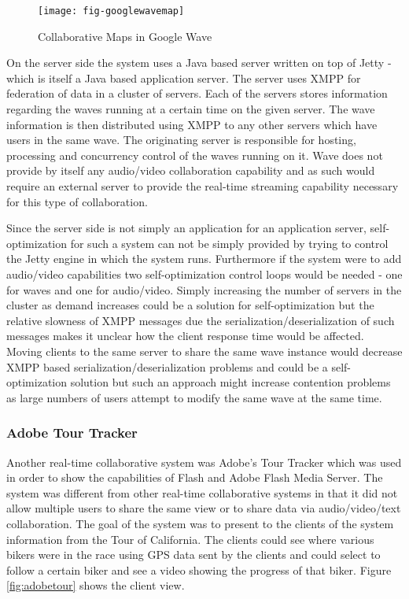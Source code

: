 {\begin{figure}
	\centering
	\texttt{[image: fig-googlewavemap]}
	\caption{Collaborative Maps in Google Wave}
	\label{fig:googlewave}
\end{figure}

On the server side the system uses a Java based server written on top of Jetty - which is itself a Java based application server. The server uses XMPP for federation of data in a cluster of servers. Each of the servers stores information regarding the waves running at a certain time on the given server. The wave information is then distributed using XMPP to any other servers which have users in the same wave. The originating server is responsible for hosting, processing and concurrency control of the waves running on it. Wave does not provide by itself any audio/video collaboration capability and as such would require an external server to provide the real-time streaming capability necessary for this type of collaboration.

Since the server side is not simply an application for an application server, self-optimization for such a system can not be simply provided by trying to control the Jetty engine in which the system runs. Furthermore if the system were to add audio/video capabilities two self-optimization control loops would be needed - one for waves and one for audio/video. Simply increasing the number of servers in the cluster as demand increases could be a solution for self-optimization but the relative slowness of XMPP messages due the serialization/deserialization of such messages makes it unclear how the client response time would be affected. Moving clients to the same server to share the same wave instance would decrease XMPP based serialization/deserialization problems and could be a self-optimization solution but such an approach might increase contention problems as large numbers of users attempt to modify the same wave at the same time.

\subsubsection{Adobe Tour Tracker}

Another real-time collaborative system was Adobe's Tour Tracker which was used in order to show the capabilities of Flash and Adobe Flash Media Server. The system was different from other real-time collaborative systems in that it did not allow multiple users to share the same view or to share data via audio/video/text collaboration. The goal of the system was to present to the clients of the system information from the Tour of California. The clients could see where various bikers were in the race using GPS data sent by the clients and could select to follow a certain biker and see a video showing the progress of that biker. Figure \ref{fig:adobetour} shows the client view.

}
